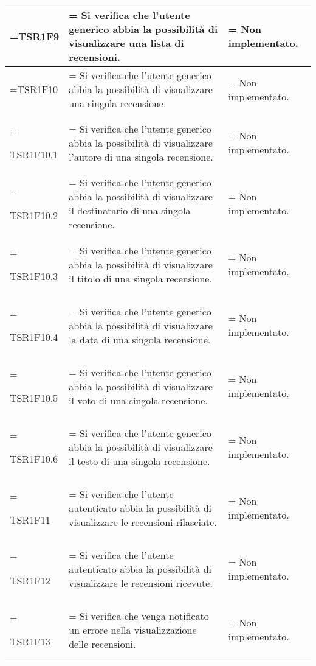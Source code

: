 \begin{xltabular}{\textwidth} {
            >{\hsize\linewidth=\hsize}X
            >{\hsize\linewidth=\hsize}X
            >{\hsize\linewidth=\hsize}X
        }
        TSR1F9 &
        Si verifica che l'utente generico abbia la possibilità di visualizzare una lista di recensioni.  &
        Non implementato.
        \\ \hline

        TSR1F10 &
        Si verifica che l'utente generico abbia la possibilità di visualizzare una singola recensione. &
        Non implementato.
        \\ \hline

        TSR1F10.1 &
        Si verifica che l'utente generico abbia la possibilità di visualizzare l'autore di una singola recensione.  &
        Non implementato.
        \\ \hline

        TSR1F10.2 &
        Si verifica che l'utente generico abbia la possibilità di visualizzare il destinatario di una singola recensione.  &
        Non implementato.
        \\ \hline

        TSR1F10.3 &
        Si verifica che l'utente generico abbia la possibilità di visualizzare il titolo di una singola recensione.  &
        Non implementato.
        \\ \hline

        TSR1F10.4 &
        Si verifica che l'utente generico abbia la possibilità di visualizzare la data di una singola recensione.  &
        Non implementato.
        \\ \hline
        
        TSR1F10.5 &
        Si verifica che l'utente generico abbia la possibilità di visualizzare il voto di una singola recensione.  &
        Non implementato.
        \\ \hline

        TSR1F10.6 &
        Si verifica che l'utente generico abbia la possibilità di visualizzare il testo di una singola recensione.  &
        Non implementato.
        \\ \hline

        TSR1F11 &
        Si verifica che l'utente autenticato abbia la possibilità di visualizzare le recensioni rilasciate.  &
        Non implementato.
        \\ \hline

        TSR1F12 &
        Si verifica che l'utente autenticato abbia la possibilità di visualizzare le recensioni ricevute.  &
        Non implementato.
        \\ \hline

        TSR1F13 &
        Si verifica che venga notificato un errore nella visualizzazione delle recensioni.  &
        Non implementato.
        \\ \hline


\end{xltabular}

